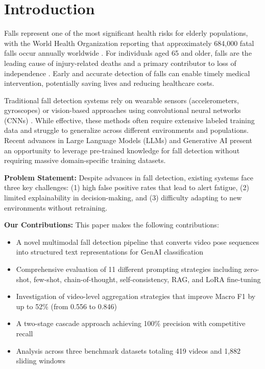 \documentclass[conference]{IEEEtran}
\begin{document}
\section{Introduction}

Falls represent one of the most significant health risks for elderly populations, with the World Health Organization reporting that approximately 684,000 fatal falls occur annually worldwide \cite{who2021falls}. For individuals aged 65 and older, falls are the leading cause of injury-related deaths and a primary contributor to loss of independence \cite{cdc2020falls}. Early and accurate detection of falls can enable timely medical intervention, potentially saving lives and reducing healthcare costs.

Traditional fall detection systems rely on wearable sensors (accelerometers, gyroscopes) or vision-based approaches using convolutional neural networks (CNNs) \cite{noury2007fall, mubashir2013survey}. While effective, these methods often require extensive labeled training data and struggle to generalize across different environments and populations. Recent advances in Large Language Models (LLMs) and Generative AI present an opportunity to leverage pre-trained knowledge for fall detection without requiring massive domain-specific training datasets.

\textbf{Problem Statement:} Despite advances in fall detection, existing systems face three key challenges: (1) high false positive rates that lead to alert fatigue, (2) limited explainability in decision-making, and (3) difficulty adapting to new environments without retraining.

\textbf{Our Contributions:} This paper makes the following contributions:
\begin{itemize}
    \item A novel multimodal fall detection pipeline that converts video pose sequences into structured text representations for GenAI classification
    \item Comprehensive evaluation of 11 different prompting strategies including zero-shot, few-shot, chain-of-thought, self-consistency, RAG, and LoRA fine-tuning
    \item Investigation of video-level aggregation strategies that improve Macro F1 by up to 52\% (from 0.556 to 0.846)
    \item A two-stage cascade approach achieving 100\% precision with competitive recall
    \item Analysis across three benchmark datasets totaling 419 videos and 1,882 sliding windows
\end{itemize}
\end{document}
